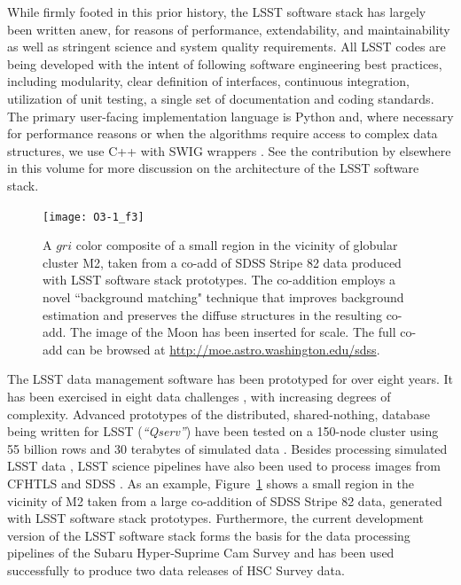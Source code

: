 \documentclass[11pt,twoside]{article}
\begin{document}
While firmly footed in this prior history, the LSST software stack has
largely been written anew, for reasons of performance, extendability, and
maintainability as well as stringent science and system quality requirements.
All LSST codes are being developed with the intent of
following software engineering best practices, including modularity, clear definition
of interfaces, continuous integration,
utilization of unit testing, a single set of documentation and coding
standards. The primary user-facing implementation language is Python and, where
necessary for performance reasons or when the algorithms require access to 
complex data structures, we use C++ with SWIG wrappers
\citep{Beazley:1996:SEU:1267498.1267513}.
See the contribution by \citet{P056_adassxxv} elsewhere in this volume for
more discussion on the architecture of the LSST software stack.
\\

\begin{figure}[!t]
%
%
\texttt{[image: O3-1\_f3]}
\caption{
A $gri$ color composite of a small region in the vicinity of globular cluster M2, taken from a co-add of
SDSS Stripe 82 data produced with LSST software stack prototypes.  The
co-addition employs a novel ``background matching" technique
\citep{2014MNRAS.440.1296H} that improves
background estimation and preserves the diffuse structures in the resulting
co-add. The image of the Moon has been inserted for scale. The full
co-add can be browsed at \url{http://moe.astro.washington.edu/sdss}.}
\label{Fig:DMStripe82}
\end{figure}


The LSST data management software has been prototyped for over eight
years. It has been exercised in eight data challenges \citep[see e.g.][]{2010SPIE.7740E..1OK}, with increasing
degrees of complexity. Advanced prototypes of the distributed, shared-nothing, database 
being written for LSST ({\em ``Qserv''}) have been tested on
a 150-node cluster using 55 billion rows and 30 terabytes of
simulated data \citep{Wang:2011:QDS:2063348.2063364, qserv-s15tests}. Besides processing simulated LSST data
\citep{2014SPIE.9150E..14C, 0067-0049-218-1-14}, LSST science pipelines
have also been used to process images from CFHTLS
and SDSS \citep{2012ApJS..203...21A}. As an example,
Figure~\ref{Fig:DMStripe82} shows a small region in the vicinity of M2
taken from a large co-addition of SDSS Stripe 82 data, generated with LSST
software stack prototypes. Furthermore, the current development version
of the LSST software stack forms the basis for the data processing pipelines
of the Subaru Hyper-Suprime Cam Survey \citep{2012SPIE.8446E..0ZM} and
has been used successfully to produce two data releases of HSC Survey data.
\\
\end{document}
